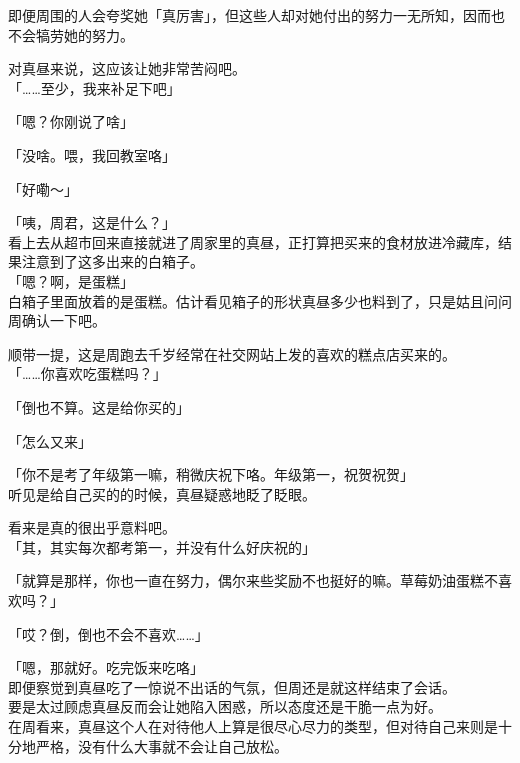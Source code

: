 即便周围的人会夸奖她「真厉害」，但这些人却对她付出的努力一无所知，因而也不会犒劳她的努力。

对真昼来说，这应该让她非常苦闷吧。\\

「……至少，我来补足下吧」

「嗯？你刚说了啥」

「没啥。喂，我回教室咯」

「好嘞～」\\

\vspace{2\baselineskip}

「咦，周君，这是什么？」\\

看上去从超市回来直接就进了周家里的真昼，正打算把买来的食材放进冷藏库，结果注意到了这多出来的白箱子。\\

「嗯？啊，是蛋糕」\\

白箱子里面放着的是蛋糕。估计看见箱子的形状真昼多少也料到了，只是姑且问问周确认一下吧。

顺带一提，这是周跑去千岁经常在社交网站上发的喜欢的糕点店买来的。\\

「……你喜欢吃蛋糕吗？」

「倒也不算。这是给你买的」

「怎么又来」

「你不是考了年级第一嘛，稍微庆祝下咯。年级第一，祝贺祝贺」\\

听见是给自己买的的时候，真昼疑惑地眨了眨眼。

看来是真的很出乎意料吧。\\

「其，其实每次都考第一，并没有什么好庆祝的」

「就算是那样，你也一直在努力，偶尔来些奖励不也挺好的嘛。草莓奶油蛋糕不喜欢吗？」

「哎？倒，倒也不会不喜欢……」

「嗯，那就好。吃完饭来吃咯」\\

即便察觉到真昼吃了一惊说不出话的气氛，但周还是就这样结束了会话。\\

要是太过顾虑真昼反而会让她陷入困惑，所以态度还是干脆一点为好。\\

在周看来，真昼这个人在对待他人上算是很尽心尽力的类型，但对待自己来则是十分地严格，没有什么大事就不会让自己放松。

